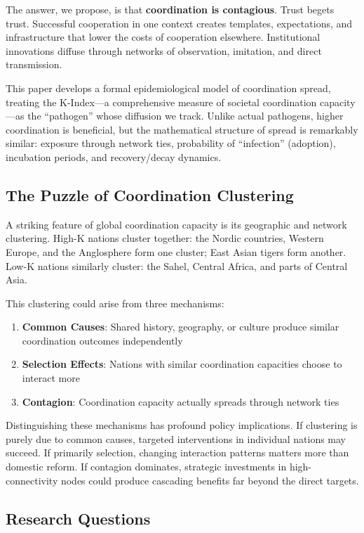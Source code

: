 \documentclass[12pt,a4paper]{article}
\begin{document}
The answer, we propose, is that \textbf{coordination is contagious}. Trust begets trust. Successful cooperation in one context creates templates, expectations, and infrastructure that lower the costs of cooperation elsewhere. Institutional innovations diffuse through networks of observation, imitation, and direct transmission.

This paper develops a formal epidemiological model of coordination spread, treating the K-Index---a comprehensive measure of societal coordination capacity \citep{Paper1}---as the ``pathogen'' whose diffusion we track. Unlike actual pathogens, higher coordination is beneficial, but the mathematical structure of spread is remarkably similar: exposure through network ties, probability of ``infection'' (adoption), incubation periods, and recovery/decay dynamics.

\subsection{The Puzzle of Coordination Clustering}

A striking feature of global coordination capacity is its geographic and network clustering. High-K nations cluster together: the Nordic countries, Western Europe, and the Anglosphere form one cluster; East Asian tigers form another. Low-K nations similarly cluster: the Sahel, Central Africa, and parts of Central Asia.

This clustering could arise from three mechanisms:
\begin{enumerate}
    \item \textbf{Common Causes}: Shared history, geography, or culture produce similar coordination outcomes independently
    \item \textbf{Selection Effects}: Nations with similar coordination capacities choose to interact more
    \item \textbf{Contagion}: Coordination capacity actually spreads through network ties
\end{enumerate}

Distinguishing these mechanisms has profound policy implications. If clustering is purely due to common causes, targeted interventions in individual nations may succeed. If primarily selection, changing interaction patterns matters more than domestic reform. If contagion dominates, strategic investments in high-connectivity nodes could produce cascading benefits far beyond the direct targets.

\subsection{Research Questions}
\end{document}
